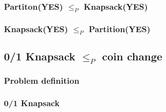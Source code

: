 \documentclass[9pt]{extarticle}
\begin{document}
\subsubsection*{Partiton(YES) $\leq_P$ Knapsack(YES)}

\subsubsection*{Knapsack(YES) $\leq_P$ Partition(YES)}
\subsection{0/1 Knapsack $\leq_P$ coin change}
\subsubsection*{Problem definition} 
\subsubsection*{0/1 Knapsack}
\[\]
\end{document}
